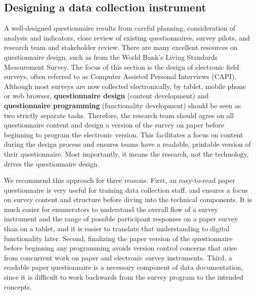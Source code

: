 \subsection{Designing a data collection instrument}

A well-designed questionnaire results from careful planning,
consideration of analysis and indicators,
close review of existing questionnaires,
survey pilots, and research team and stakeholder review.
There are many excellent resources on questionnaire design,
such as from the World Bank's Living Standards Measurement Survey.
The focus of this section is the design of electronic field surveys,
often referred to as Computer Assisted Personal Interviews (CAPI).
Although most surveys are now collected electronically, by tablet, mobile phone or web browser,
\textbf{questionnaire design}
(content development) and \textbf{questionnaire programming}
(functionality development) should be seen as two strictly separate tasks.
Therefore, the research team should agree on all questionnaire content
and design a version of the survey on paper
before beginning to program the electronic version.
This facilitates a focus on content during the design process
and ensures teams have a readable, printable version of their questionnaire.
Most importantly, it means the research, not the technology,
drives the questionnaire design.

We recommend this approach for three reasons.
First, an easy-to-read paper questionnaire
is very useful for training data collection staff,
and ensures a focus on survey content and structure
before diving into the technical components.
It is much easier for enumerators to understand
the overall flow of a survey instrument and 
the range of possible participant responses
on a paper survey than on a tablet,
and it is easier to translate that understanding to digital functionality later.
Second, finalizing the paper version of the questionnaire before beginning any programming
avoids version control concerns that arise from concurrent work
on paper and electronic survey instruments.
Third, a readable paper questionnaire is a necessary component of data documentation,
since it is difficult to work backwards from the survey program to the intended concepts.

